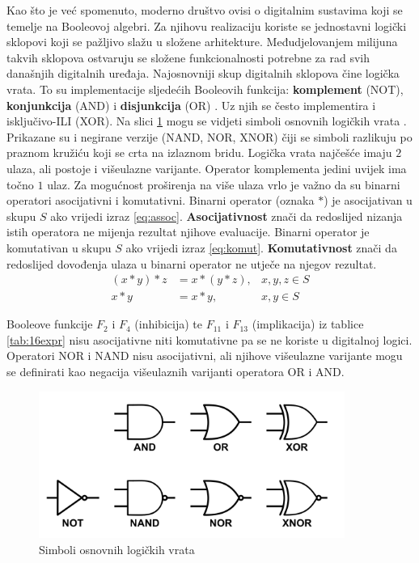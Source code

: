 \documentclass[times, utf8, diplomski]{fer}
\begin{document}
Kao što je već spomenuto, moderno društvo ovisi o digitalnim sustavima koji se temelje na Booleovoj algebri. Za njihovu realizaciju koriste se jednostavni logički sklopovi koji se pažljivo slažu u složene arhitekture. Međudjelovanjem milijuna takvih sklopova ostvaruju se složene funkcionalnosti potrebne za rad svih današnjih digitalnih uređaja. Najosnovniji skup digitalnih sklopova čine logička vrata. To su implementacije sljedećih Booleovih funkcija: \textbf{komplement} (NOT), \textbf{konjunkcija} (AND) i \textbf{disjunkcija} (OR) \cite{book:digitalDesign}. Uz njih se često implementira i isključivo-ILI (XOR). Na slici \ref{fig:logic-gates} mogu se vidjeti simboli osnovnih logičkih vrata \cite{site:schemeIt}. Prikazane su i negirane verzije (NAND, NOR, XNOR) čiji se simboli razlikuju po praznom kružiću koji se crta na izlaznom bridu. Logička vrata najčešće imaju $2$ ulaza, ali postoje i višeulazne varijante. Operator komplementa jedini uvijek ima točno $1$ ulaz. Za mogućnost proširenja na više ulaza vrlo je važno da su binarni operatori asocijativni i komutativni. Binarni operator (oznaka $*$) je asocijativan u skupu $S$ ako vrijedi izraz \ref{eq:assoc}. \textbf{Asocijativnost} znači da redoslijed nizanja istih operatora ne mijenja rezultat njihove evaluacije. Binarni operator je komutativan u skupu $S$ ako vrijedi izraz \ref{eq:komut}. \textbf{Komutativnost} znači da redoslijed dovođenja ulaza u binarni operator ne utječe na njegov rezultat.
%
\begin{align}
	\label{eq:assoc}
	(x*y)*z &= x*(y*z), & x,y,z \in S \\
	\label{eq:komut}
	x*y &= x*y, & x,y \in S
\end{align}

\noindent
Booleove funkcije $F_{2}$ i $F_{4}$ (inhibicija) te $F_{11}$ i $F_{13}$ (implikacija) iz tablice \ref{tab:16expr} nisu asocijativne niti komutativne pa se ne koriste u digitalnoj logici. Operatori NOR i NAND nisu asocijativni, ali njihove višeulazne varijante mogu se definirati kao negacija višeulaznih varijanti operatora OR i AND.

\begin{figure}[htb]
	\centering
	\includegraphics[width=10cm]{img/logic_gates.png}
	\caption{Simboli osnovnih logičkih vrata}
	\label{fig:logic-gates}
\end{figure}
\end{document}
